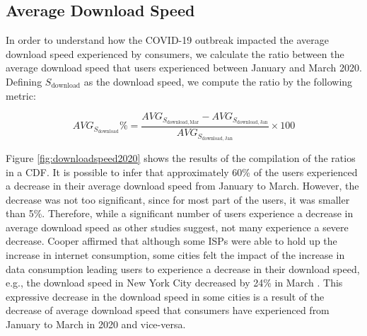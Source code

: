 \documentclass[conference,10pt]{IEEEtran}
\begin{document}
\subsection{Average Download Speed}
\label{sec:average-download-speed}

In order to understand how the COVID-19 outbreak impacted the average download speed experienced by consumers, we calculate the ratio between the average download speed that users experienced between January and March 2020. Defining $S_{\text{download}}$ as the download speed, we compute the ratio by the following metric:

\begin{equation}
AVG_{S_{\text{download}}}\% = \frac{AVG_{S_{\text{download},\, \text{Mar}}}-AVG_{S_{\text{download},\, \text{Jan}}}}{AVG_{S_{\text{download},\, \text{Jan}}}}\times 100
\end{equation}


Figure \ref{fig:downloadspeed2020} shows the results of the compilation of the ratios in a CDF. It is possible to infer that approximately 60\% of the users experienced a decrease in their average download speed from January to March. However, the decrease was not too significant, since for most part of the users, it was smaller than 5\%. Therefore, while a significant number of users experience a decrease in average download speed as other studies suggest, not many experience a severe decrease. Cooper affirmed that although some ISPs were able to hold up the increase in internet consumption, some cities felt the impact of the increase in data consumption leading users to experience a decrease in their download speed, e.g., the download speed in New York City decreased by 24\% in March \cite{cooper}. This expressive decrease in the download speed in some cities is a result of the decrease of average download speed that consumers have experienced from January to March in 2020 and vice-versa.

\end{document}
